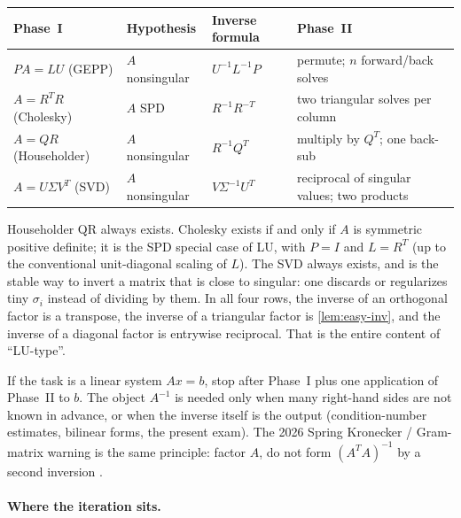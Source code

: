 {\footnotesize
\begin{center}
\begin{tabular}{@{}>{\raggedright\arraybackslash}p{2.55cm}
                   >{\raggedright\arraybackslash}p{2.85cm}
                   >{\raggedright\arraybackslash}p{3.15cm}
                   >{\raggedright\arraybackslash}p{4.15cm}@{}}
\toprule
Phase~I & Hypothesis & Inverse formula & Phase~II \\
\midrule
\(PA=LU\) (GEPP) & \(A\) nonsingular & \(U^{-1}L^{-1}P\) & permute; \(n\) forward/back solves \\
\(A=R^{T}R\) (Cholesky) & \(A\) SPD & \(R^{-1}R^{-T}\) & two triangular solves per column \\
\(A=QR\) (Householder) & \(A\) nonsingular & \(R^{-1}Q^{T}\) & multiply by \(Q^{T}\); one back-sub \\
\(A=U\Sigma V^{T}\) (SVD) & \(A\) nonsingular & \(V\Sigma^{-1}U^{T}\) & reciprocal of singular values; two products \\
\bottomrule
\end{tabular}
\end{center}
}

Householder QR always exists. Cholesky exists if and only if \(A\) is symmetric positive definite; it is the SPD special case of LU, with \(P=I\) and \(L=R^{T}\) (up to the conventional unit-diagonal scaling of \(L\)). The SVD always exists, and is the stable way to invert a matrix that is close to singular: one discards or regularizes tiny \(\sigma_{i}\) instead of dividing by them. In all four rows, the inverse of an orthogonal factor is a transpose, the inverse of a triangular factor is \cref{lem:easy-inv}, and the inverse of a diagonal factor is entrywise reciprocal. That is the entire content of ``LU-type''.

\begin{remark}
\label{rem:dont-invert}
If the task is a linear system \(Ax=b\), stop after Phase~I plus one application of Phase~II to \(b\). The object \(A^{-1}\) is needed only when many right-hand sides are not known in advance, or when the inverse itself is the output (condition-number estimates, bilinear forms, the present exam). The 2026 Spring Kronecker / Gram-matrix warning is the same principle: factor \(A\), do not form \((A^{T}A)^{-1}\) by a second inversion \cite{trefethen97}.
\end{remark}

\paragraph{Where the iteration sits.}

